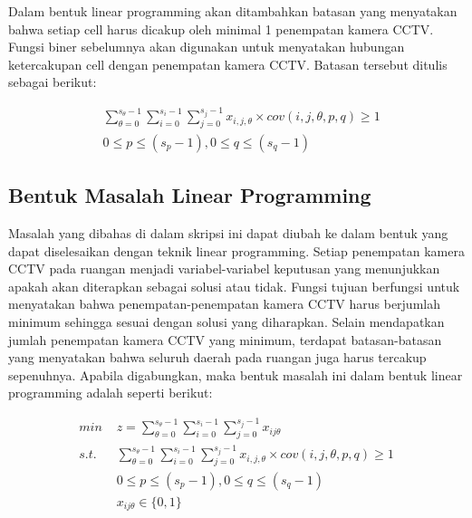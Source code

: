 Dalam bentuk linear programming akan ditambahkan batasan yang menyatakan bahwa setiap cell harus dicakup oleh minimal 1 penempatan kamera CCTV. Fungsi biner sebelumnya akan digunakan untuk menyatakan hubungan ketercakupan cell dengan penempatan kamera CCTV. Batasan tersebut ditulis sebagai berikut:

\begin{equation*}
	\begin{split}
		& \sum_{\theta=0}^{s_{\theta}-1} \sum_{i=0}^{s_i-1} \sum_{j=0}^{s_j-1} x_{i,j,\theta} \times cov(i,j,\theta,p,q) \geq 1\\
		& 0 \leq p \leq (s_p - 1), 0 \leq q \leq (s_q - 1)
	\end{split}
\end{equation*}

\subsection{Bentuk Masalah Linear Programming}
Masalah yang dibahas di dalam skripsi ini dapat diubah ke dalam bentuk yang dapat diselesaikan dengan teknik linear programming. Setiap penempatan kamera CCTV pada ruangan menjadi variabel-variabel keputusan yang menunjukkan apakah akan diterapkan sebagai solusi atau tidak. Fungsi tujuan berfungsi untuk menyatakan bahwa penempatan-penempatan kamera CCTV harus berjumlah minimum sehingga sesuai dengan solusi yang diharapkan. Selain mendapatkan jumlah penempatan kamera CCTV yang minimum, terdapat batasan-batasan yang menyatakan bahwa seluruh daerah pada ruangan juga harus tercakup sepenuhnya. Apabila digabungkan, maka bentuk masalah ini dalam bentuk linear programming adalah seperti berikut:

\begin{equation*}
	\begin{split}
		\textit{min } & z = \sum_{\theta=0}^{s_{\theta}-1} \sum_{i=0}^{s_i-1} \sum_{j=0}^{s_j-1} x_{ij\theta}\\
		\textit{s.t. } & \sum_{\theta=0}^{s_{\theta}-1} \sum_{i=0}^{s_i-1} \sum_{j=0}^{s_j-1} x_{i,j,\theta} \times cov(i,j,\theta,p,q) \geq 1\\
		& 0 \leq p \leq (s_p - 1), 0 \leq q \leq (s_q - 1)\\
		& x_{ij\theta} \in \{0,1\}
	\end{split}
\end{equation*}

